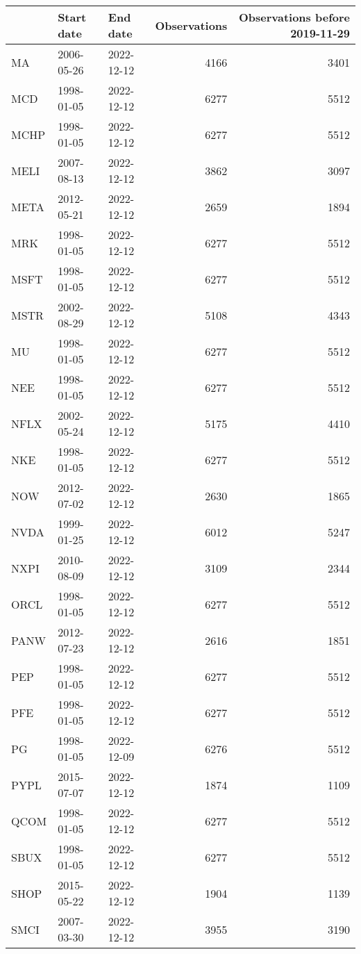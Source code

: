 \begin{table}[ht]
\centering
\begin{tabular}{lllrr}
  \hline
 & Start date & End date & Observations & Observations before 2019-11-29 \\ 
  \hline
MA & 2006-05-26 & 2022-12-12 & 4166 & 3401 \\ 
  MCD & 1998-01-05 & 2022-12-12 & 6277 & 5512 \\ 
  MCHP & 1998-01-05 & 2022-12-12 & 6277 & 5512 \\ 
  MELI & 2007-08-13 & 2022-12-12 & 3862 & 3097 \\ 
  META & 2012-05-21 & 2022-12-12 & 2659 & 1894 \\ 
  MRK & 1998-01-05 & 2022-12-12 & 6277 & 5512 \\ 
  MSFT & 1998-01-05 & 2022-12-12 & 6277 & 5512 \\ 
  MSTR & 2002-08-29 & 2022-12-12 & 5108 & 4343 \\ 
  MU & 1998-01-05 & 2022-12-12 & 6277 & 5512 \\ 
  NEE & 1998-01-05 & 2022-12-12 & 6277 & 5512 \\ 
  NFLX & 2002-05-24 & 2022-12-12 & 5175 & 4410 \\ 
  NKE & 1998-01-05 & 2022-12-12 & 6277 & 5512 \\ 
  NOW & 2012-07-02 & 2022-12-12 & 2630 & 1865 \\ 
  NVDA & 1999-01-25 & 2022-12-12 & 6012 & 5247 \\ 
  NXPI & 2010-08-09 & 2022-12-12 & 3109 & 2344 \\ 
  ORCL & 1998-01-05 & 2022-12-12 & 6277 & 5512 \\ 
  PANW & 2012-07-23 & 2022-12-12 & 2616 & 1851 \\ 
  PEP & 1998-01-05 & 2022-12-12 & 6277 & 5512 \\ 
  PFE & 1998-01-05 & 2022-12-12 & 6277 & 5512 \\ 
  PG & 1998-01-05 & 2022-12-09 & 6276 & 5512 \\ 
  PYPL & 2015-07-07 & 2022-12-12 & 1874 & 1109 \\ 
  QCOM & 1998-01-05 & 2022-12-12 & 6277 & 5512 \\ 
  SBUX & 1998-01-05 & 2022-12-12 & 6277 & 5512 \\ 
  SHOP & 2015-05-22 & 2022-12-12 & 1904 & 1139 \\ 
  SMCI & 2007-03-30 & 2022-12-12 & 3955 & 3190 \\ 

\end{tabular}
\end{table}
